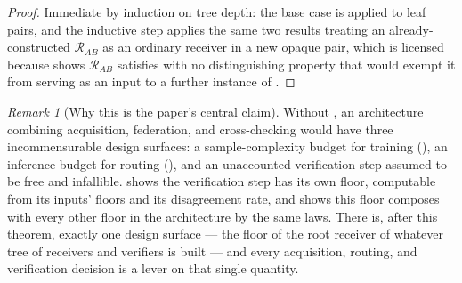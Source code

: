\documentclass[11pt,twocolumn,a4paper]{article}
\theoremstyle{rdm}
\theoremstyle{definition}
\theoremstyle{remark}
\newtheorem{remark}[theorem]{Remark}
\newcommand{\Rec}{\mathcal{R}}
\begin{document}
\begin{proof}
Immediate by induction on tree depth: the base case is
 applied to leaf pairs, and the
inductive step applies the same two results treating an already-constructed
$\Rec_{AB}$ as an ordinary receiver in a new opaque pair, which is licensed
because  shows $\Rec_{AB}$ satisfies
 with no distinguishing property that would exempt it
from serving as an input to a further instance of .
\end{proof}

\begin{remark}[Why this is the paper's central claim]
\label{rem:central-claim}
Without , an architecture combining acquisition,
federation, and cross-checking would have three incommensurable design
surfaces: a sample-complexity budget for training
(), an inference budget for routing
(), and an unaccounted verification step assumed to be
free and infallible.  shows the verification step has
its own floor, computable from its inputs' floors and its disagreement
rate, and  shows this floor composes with every other
floor in the architecture by the same laws. There is, after this theorem,
exactly one design surface --- the floor of the root receiver of whatever
tree of receivers and verifiers is built --- and every acquisition, routing,
and verification decision is a lever on that single quantity.
\end{remark}
\end{document}
